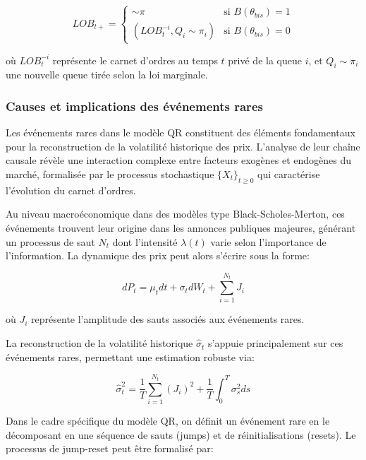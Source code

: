 \documentclass[12pt,a4paper]{article}
\theoremstyle{definition}
\theoremstyle{remark}
\begin{document}
\begin{equation}
    LOB_{t+} = \begin{cases}
        \sim \pi & \text{si } B(\theta_{bis}) = 1 \\
        (LOB_t^{-i}, Q_i \sim \pi_i) & \text{si } B(\theta_{bis}) = 0
    \end{cases}
\end{equation}

où $LOB_t^{-i}$ représente le carnet d'ordres au temps $t$ privé de la queue $i$, et $Q_i \sim \pi_i$ une nouvelle queue tirée selon la loi marginale.



\subsubsection{Causes et implications des événements rares}

Les événements rares dans le modèle QR constituent des éléments fondamentaux pour la reconstruction de la volatilité historique des prix. L'analyse de leur chaîne causale révèle une interaction complexe entre facteurs exogènes et endogènes du marché, formalisée par le processus stochastique $\{X_t\}_{t\geq 0}$ qui caractérise l'évolution du carnet d'ordres.

Au niveau macroéconomique dans des modèles type Black-Scholes-Merton, ces événements trouvent leur origine dans les annonces publiques majeures, générant un processus de saut $N_t$ dont l'intensité $\lambda(t)$ varie selon l'importance de l'information. La dynamique des prix peut alors s'écrire sous la forme:

\begin{equation}
dP_t = \mu_t dt + \sigma_t dW_t + \sum_{i=1}^{N_t} J_i
\end{equation}

où $J_i$ représente l'amplitude des sauts associés aux événements rares.


La reconstruction de la volatilité historique $\hat{\sigma}_t$ s'appuie principalement sur ces événements rares, permettant une estimation robuste via:

\begin{equation}
\hat{\sigma}_t^2 = \frac{1}{T}\sum_{i=1}^{N_t} (J_i)^2 + \frac{1}{T}\int_0^T \sigma_s^2 ds
\end{equation}


Dans le cadre spécifique du modèle QR, on définit un événement rare en le décomposant en une séquence de sauts (jumps) et de réinitialisations (resets). Le processus de jump-reset peut être formalisé par:
\end{document}
